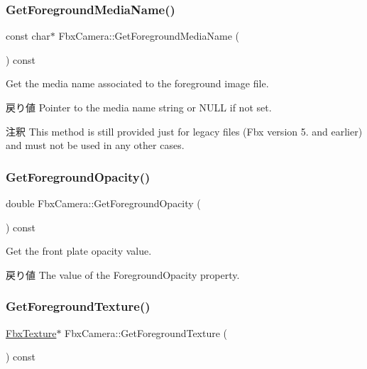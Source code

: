 \subsubsection{\texorpdfstring{Get\+Foreground\+Media\+Name()}{GetForegroundMediaName()}}
{\footnotesize\ttfamily const char$\ast$ Fbx\+Camera\+::\+Get\+Foreground\+Media\+Name (\begin{DoxyParamCaption}{ }\end{DoxyParamCaption}) const}

Get the media name associated to the foreground image file. \begin{DoxyReturn}{戻り値}
Pointer to the media name string or {\ttfamily N\+U\+LL} if not set. 
\end{DoxyReturn}
\begin{DoxyRemark}{注釈}
This method is still provided just for legacy files (Fbx version 5. and earlier) and must not be used in any other cases. 
\end{DoxyRemark}
\mbox{\label{class_fbx_camera_a21876836377a4b548df5e08c6afe8a17}} 
\subsubsection{\texorpdfstring{Get\+Foreground\+Opacity()}{GetForegroundOpacity()}}
{\footnotesize\ttfamily double Fbx\+Camera\+::\+Get\+Foreground\+Opacity (\begin{DoxyParamCaption}{ }\end{DoxyParamCaption}) const}

Get the front plate opacity value. \begin{DoxyReturn}{戻り値}
The value of the Foreground\+Opacity property. 
\end{DoxyReturn}
\mbox{\label{class_fbx_camera_a93ed0742bf378a047d77fa6daf8233ae}} 
\subsubsection{\texorpdfstring{Get\+Foreground\+Texture()}{GetForegroundTexture()}}
{\footnotesize\ttfamily \hyperlink{class_fbx_texture}{Fbx\+Texture}$\ast$ Fbx\+Camera\+::\+Get\+Foreground\+Texture (\begin{DoxyParamCaption}{ }\end{DoxyParamCaption}) const}

